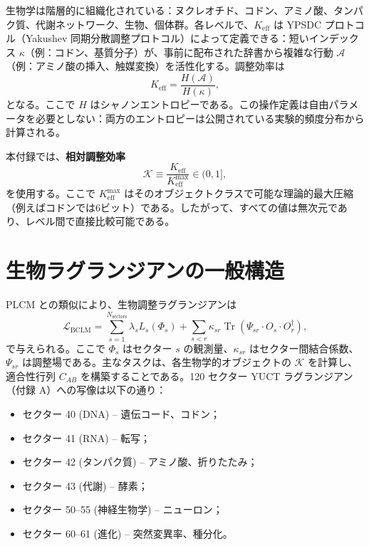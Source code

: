 \documentclass[12pt,a4paper]{ltjsarticle}
\newcommand{\REL}{\mathcal{K}}          %
\begin{document}
	生物学は階層的に組織化されている：ヌクレオチド、コドン、アミノ酸、タンパク質、代謝ネットワーク、生物、個体群。各レベルで、\(K_{\mathrm{eff}}\) は YPSDC プロトコル（Yakushev 同期分散調整プロトコル）によって定義できる：短いインデックス \(\kappa\)（例：コドン、基質分子）が、事前に配布された辞書から複雑な行動 \(\mathcal{A}\)（例：アミノ酸の挿入、触媒変換）を活性化する。調整効率は
	\[
	K_{\mathrm{eff}} = \frac{H(\mathcal{A})}{H(\kappa)},
	\]
	となる。ここで \(H\) はシャノンエントロピーである。この操作定義は自由パラメータを必要としない：両方のエントロピーは公開されている実験的頻度分布から計算される。
	
	本付録では、\textbf{相対調整効率}
	\[
	\REL \equiv \frac{K_{\mathrm{eff}}}{K_{\mathrm{eff}}^{\max}} \in (0,1],
	\]
	を使用する。ここで \(K_{\mathrm{eff}}^{\max}\) はそのオブジェクトクラスで可能な理論的最大圧縮（例えばコドンでは6ビット）である。したがって、すべての値は無次元であり、レベル間で直接比較可能である。
	
	\section{生物ラグランジアンの一般構造}
	PLCM との類似により、生物調整ラグランジアンは
	\begin{equation}
		\mathcal{L}_{\text{BCLM}} = \sum_{s=1}^{N_{\text{sectors}}} \lambda_s L_s(\Phi_s) + \sum_{s<r} \kappa_{sr} \operatorname{Tr}(\Psi_{sr} \cdot O_s \cdot O_r^\dagger),
		\label{eq:BCLM}
	\end{equation}
	で与えられる。ここで \(\Phi_s\) はセクター \(s\) の観測量、\(\kappa_{sr}\) はセクター間結合係数、\(\Psi_{sr}\) は調整場である。主なタスクは、各生物学的オブジェクトの \(\REL\) を計算し、適合性行列 \(C_{AB}\) を構築することである。120 セクター YUCT ラグランジアン（付録 A）への写像は以下の通り：
	\begin{itemize}
		\item セクター 40 (DNA) – 遺伝コード、コドン；
		\item セクター 41 (RNA) – 転写；
		\item セクター 42 (タンパク質) – アミノ酸、折りたたみ；
		\item セクター 43 (代謝) – 酵素；
		\item セクター 50–55 (神経生物学) – ニューロン；
		\item セクター 60–61 (進化) – 突然変異率、種分化。
	\end{itemize}
	
\end{document}
